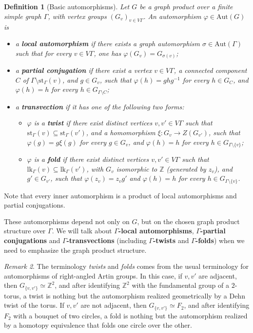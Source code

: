 \documentclass[a4paper,english,11pt]{article}
\newtheorem{de}{Definition}[section]
\theoremstyle{definition}
\theoremstyle{remark}
\newtheorem{rk}[de]{Remark}
\newcommand{\st}{\mathrm{st}}
\newcommand{\lk}{\mathrm{lk}}
\newcommand{\Aut}{\mathrm{Aut}}
\newcommand{\twistor}{\xi}
\newcommand{\deffont}[1]{\textbf{#1}}
\begin{document}
\begin{de}[Basic automorphisms]\label{de:basic}
Let $G$ be a graph product over a finite simple graph $\Gamma$, with vertex groups $(G_v)_{v\in V\Gamma}$. An automorphism $\varphi\in\Aut(G)$ is
\begin{itemize}
    \item a \deffont{local automorphism} if there exists a graph automorphism $\sigma\in\Aut(\Gamma)$ such that for every $v\in V\Gamma$, one has $\varphi(G_v)=G_{\sigma(v)}$; 
    \item a \deffont{partial conjugation} if there exist a vertex $v\in V\Gamma$, a connected component $C$ of $\Gamma\setminus\st_\Gamma(v)$, and $g\in G_v$, such that $\varphi(h)=ghg^{-1}$ for every $h\in G_C$, and $\varphi(h)=h$ for every $h\in G_{\Gamma\setminus C}$;  
    \item a \deffont{transvection} if it has one of the following two forms:
    \begin{itemize}
        \item $\varphi$ is a \deffont{twist} if there exist distinct vertices $v,v'\in V\Gamma$ such that $\st_\Gamma(v)\subseteq\st_\Gamma(v')$, and a homomorphism $\twistor:G_v\to Z(G_{v'})$, such that $\varphi(g)=g\twistor(g)$ for every $g\in G_v$, and $\varphi(h)=h$ for every $h\in G_{\Gamma\setminus\{v\}}$;
        \item $\varphi$ is a \deffont{fold} if there exist distinct vertices $v,v'\in V\Gamma$ such that $\lk_\Gamma(v)\subseteq\lk_\Gamma(v')$, with $G_v$ isomorphic to $\mathbb{Z}$ (generated by $z_v$), and $g'\in G_{v'}$, such that $\varphi(z_v)=z_vg'$ and $\varphi(h)=h$ for every $h\in G_{\Gamma\setminus\{v\}}$. 
    \end{itemize}
\end{itemize}
\end{de}

Note that every inner automorphism is a product of local automorphisms and partial conjugations.

These automorphisms depend not only on $G$, but on the chosen graph product structure over $\Gamma$. We will talk about \deffont{$\Gamma$-local automorphisms}, \deffont{$\Gamma$-partial conjugations} and \deffont{$\Gamma$-transvections} (including \deffont{$\Gamma$-twists} and \deffont{$\Gamma$-folds}) when we need to emphasize the graph product structure.

\begin{rk}
The terminology \emph{twists} and \emph{folds} comes from the usual terminology for automorphisms of right-angled Artin groups. In this case, if $v,v'$ are adjacent, then $G_{\{v,v'\}}\simeq\mathbb{Z}^2$, and after identifying $\mathbb{Z}^2$ with the fundamental group of a $2$-torus, a twist is nothing but the automorphism realized geometrically by a Dehn twist of the torus. If $v,v'$ are not adjacent, then $G_{\{v,v'\}}\simeq F_2$, and after identifying $F_2$ with a bouquet of two circles, a fold is nothing but the automorphism realized by a homotopy equivalence that folds one circle over the other.  
\end{rk}
\end{document}
